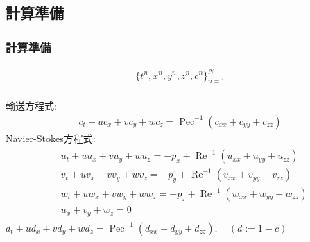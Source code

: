 \documentclass[xcolor=dvipsnames,hyperref={breaklinks=true},mathserif,professionalfont,dvipdfmx,12pt]{beamer}
\begin{document}
\subsection{計算準備}
\begin{frame}
  \frametitle{計算準備}
 \begin{align*}
  \{t^n,x^n,y^n,z^n, c^n\}_{n=1}^{N}
 \end{align*}
  \\
    \small 輸送方程式:\normalsize
    \begin{align*}
      c_{t}+u c_{x}+v c_{y}+w c_{z}=\operatorname{Pec}^{-1}\left(c_{x x}+c_{y y}+c_{z z}\right)
    \end{align*}
    \small Navier-Stokes方程式:\normalsize
    \footnotesize
    \begin{align*}
      \begin{aligned}
      &u_{t}+u u_{x}+v u_{y}+w u_{z}=-p_{x}+\operatorname{Re}^{-1}\left(u_{x x}+u_{y y}+u_{z z}\right) \\
      &v_{t}+u v_{x}+v v_{y}+w v_{z}=-p_{y}+\operatorname{Re}^{-1}\left(v_{x x}+v_{y y}+v_{z z}\right) \\
      &w_{t}+u w_{x}+v w_{y}+w w_{z}=-p_{z}+\operatorname{Re}^{-1}\left(w_{x x}+w_{y y}+w_{z z}\right) \\
      &u_{x}+v_{y}+w_{z}=0
    \end{aligned}
    \end{align*}
    \normalsize
    \small {}\normalsize \footnotesize$d_{t}+u d_{x}+v d_{y}+w d_{z}=\operatorname{Pec}^{-1}\left(d_{x x}+d_{y y}+d_{z z}\right),\quad (d:=1-c)$\normalsize
\end{frame}
\end{document}
